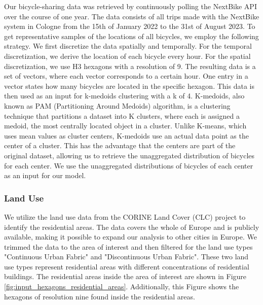 Our bicycle-sharing data was retrieved by continuously polling the NextBike API over the course of one year.
The data consists of all trips made with the NextBike system in Cologne from the 15th of January 2022 to the 31st of August 2023.
To get representative samples of the locations of all bicycles, we employ the following strategy.
We first discretize the data spatially and temporally.
For the temporal discretization, we derive the location of each bicycle every hour.
For the spatial discretization, we use H3 hexagons with a resolution of 9.
The resulting data is a set of vectors, where each vector corresponds to a certain hour.
One entry in a vector states how many bicycles are located in the specific hexagon.
This data is then used as an input for k-medoids clustering  with a k of 4.
K-medoids, also known as PAM (Partitioning Around Medoids) algorithm, is a clustering technique that partitions a dataset into K clusters, where each is assigned a medoid, the most centrally located object in a cluster. 
Unlike K-means, which uses mean values as cluster centers, K-medoids use an actual data point as the center of a cluster.
This has the advantage that the centers are part of the original dataset, allowing us to retrieve the unaggregated distribution of bicycles for each center.
We use the unaggregated distributions of bicycles of each center as an input for our model.

\subsubsection{Land Use}
\label{subs:land_use}

We utilize the land use data from the CORINE Land Cover (CLC) project  to identify the residential areas.
The data covers the whole of Europe and is publicly available, making it possible to expand our analysis to other cities in Europe.
We trimmed the data to the area of interest and then filtered for the land use types "Continuous Urban Fabric" and "Discontinuous Urban Fabric".
These two land use types represent residential areas with different concentrations of residential buildings.
The residential areas inside the area of interest are shown in Figure \ref{fig:input_hexagons_residential_areas}.
Additionally, this Figure shows the hexagons of resolution nine found inside the residential areas.

